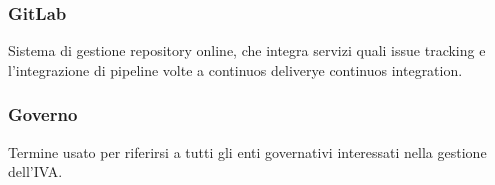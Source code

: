 \subsubsection*{GitLab}
Sistema di gestione repository online, che integra servizi quali issue tracking e l'integrazione di pipeline volte a continuos delivery\glosp e continuos integration\glo.

\subsubsection*{Governo}
Termine usato per riferirsi a tutti gli enti governativi interessati nella gestione dell'IVA.

